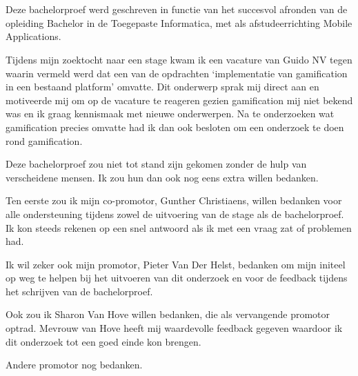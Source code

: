
\chapter*{}
\label{ch:voorwoord}


Deze bachelorproef werd geschreven in functie van het succesvol afronden van de opleiding Bachelor in de Toegepaste Informatica, met als afstudeerrichting Mobile Applications.

Tijdens mijn zoektocht naar een stage kwam ik een vacature van Guido NV tegen waarin vermeld werd dat een van de opdrachten ‘implementatie van gamification in een bestaand platform’ omvatte. Dit onderwerp sprak mij direct aan en motiveerde mij om op de vacature te reageren gezien gamification mij niet bekend was en ik graag kennismaak met nieuwe onderwerpen. Na te onderzoeken wat gamification precies omvatte had ik dan ook besloten om een onderzoek te doen rond gamification.

Deze bachelorproef zou niet tot stand zijn gekomen zonder de hulp van verscheidene mensen. Ik zou hun dan ook nog eens extra willen bedanken.

Ten eerste zou ik mijn co-promotor, Gunther Christiaens, willen bedanken voor alle ondersteuning tijdens zowel de uitvoering van de stage als de bachelorproef. Ik kon steeds rekenen op een snel antwoord als ik met een vraag zat of problemen had.

Ik wil zeker ook mijn promotor, Pieter Van Der Helst, bedanken om mijn initeel op weg te helpen bij het uitvoeren van dit onderzoek en voor de feedback tijdens het schrijven van de bachelorproef.

Ook zou ik Sharon Van Hove willen bedanken, die als vervangende promotor optrad. Mevrouw van Hove heeft mij waardevolle feedback gegeven waardoor ik dit onderzoek tot een goed einde kon brengen.

Andere promotor nog bedanken.


